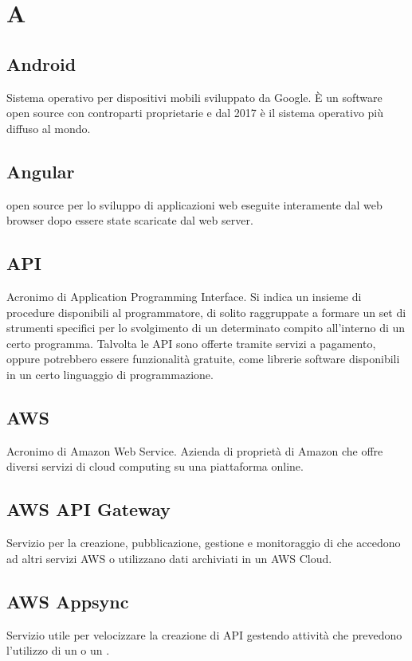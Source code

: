\section*{A}
\markright{}

\subsection*{Android}
Sistema operativo per dispositivi mobili sviluppato da Google. È un software open source con controparti proprietarie e dal 2017 è il sistema operativo più diffuso al mondo. 
 
\subsection*{Angular}
 open source per lo sviluppo di applicazioni web eseguite interamente dal web browser dopo essere state scaricate dal web server.

\subsection*{API}
Acronimo di Application Programming Interface. Si indica un  insieme  di  procedure disponibili al programmatore, di solito  raggruppate a formare un set di strumenti specifici per lo svolgimento di un determinato compito all'interno di un certo programma. Talvolta le API sono offerte tramite servizi a pagamento, oppure potrebbero essere funzionalità gratuite, come librerie software disponibili in un certo linguaggio di programmazione.

\subsection*{AWS}
Acronimo di Amazon Web Service. Azienda di proprietà di Amazon che offre diversi servizi di cloud computing su una piattaforma online.

\subsection*{AWS API Gateway}
Servizio  per la creazione, pubblicazione, gestione e monitoraggio di  che accedono ad altri servizi AWS o utilizzano dati archiviati in un AWS Cloud.

\subsection*{AWS Appsync}
Servizio  utile per velocizzare la creazione di API gestendo attività che prevedono l'utilizzo di un  o un .

